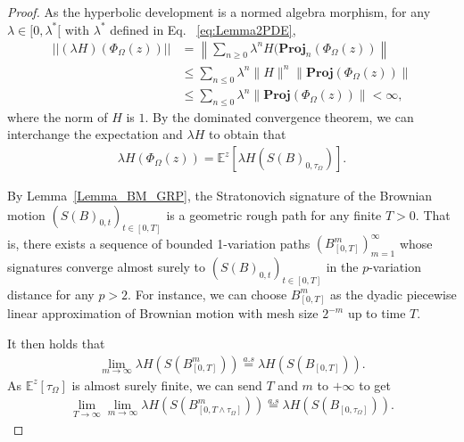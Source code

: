 \documentclass[11pt,a4paper,english,reqno]{amsart}
\theoremstyle{plain}
\newcommand{\1}{\mathbbm{1}}
\newcommand{\proj}{\mathbf{Proj}}
\begin{document}
\begin{proof}
As the hyperbolic development is a normed algebra morphism, for any $\lambda \in [0, \lambda^{*}[$ with $\lambda^{*}$ defined in Eq.~ \eqref{eq:Lemma2PDE},
\begin{align*}
||(\lambda H)(\Phi_{\Omega}(z))|| &= \left\|\sum_{n\geq 0} \lambda^n H(\proj_n(\Phi_{\Omega}(z))\right\|\\
&\leq \sum_{n \leq 0} \lambda^{n} \|H\|^n\|\proj(\Phi_{\Omega}(z))\|\\
&\leq \sum_{n \leq 0} \lambda^{n}\|\proj(\Phi_{\Omega}(z))\|<\infty,
\end{align*}
where the norm of $H$ is $1$. 
By the dominated convergence theorem, we can interchange the expectation and $\lambda H$ to obtain that
\begin{eqnarray*}
\lambda H (\Phi_{\Omega}(z)) = \mathbb{E}^{z}\left[\lambda H \left(S(B)_{0, \tau_{\Omega}}\right)\right].
\end{eqnarray*} 

By Lemma~\ref{Lemma_BM_GRP}, the Stratonovich signature of the Brownian motion $\left(S(B)_{0, t}\right)_{t\in [0, T]}$ is a geometric rough path for any finite $T> 0$. That is, there exists a sequence of bounded 1-variation paths $\left(B^{m}_{[0,T]}\right)_{m =1}^{\infty}$ whose signatures  converge almost surely to $\left(S(B)_{0, t}\right)_{t \in [0, T]}$ in the $p$-variation distance for any $p >2$. For instance, we can choose $B^{m}_{[0, T ]}$ as the dyadic piecewise linear approximation of Brownian motion with mesh size $2^{-m}$ up to time $T$. 


It then holds that 
\begin{eqnarray*}
\lim_{m \rightarrow \infty} \lambda H \left(S\left(B^{m}_{[0, T]}\right)\right) \overset{a.s}{=} \lambda H\left(S\left(B_{[0, T]}\right)\right).
\end{eqnarray*}
As $\mathbb{E}^{z}[\tau_{\Omega}]$ is almost surely finite, we can send $T$ and $m$ to $+\infty$ to get
\begin{eqnarray*}
\lim_{T \rightarrow \infty }\lim_{m \rightarrow \infty} \lambda H \left(S\left(B^{m}_{\left[0, T\wedge \tau_\Omega\right]}\right)\right) \overset{a.s}{=} \lambda H\left(S\left(B_{\left[0, \tau_\Omega\right]}\right)\right).
\end{eqnarray*}



\end{proof}
\end{document}
